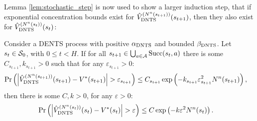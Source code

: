    Lemma \ref{lem:stochastic_step} is now used to show a larger induction step, that if exponential concentration bounds exist for ${\hat{V}^{(N^n(s_{t+1}))}_{{\textnormal{DNTS}}}}(s_{t+1})$, then they also exist for ${\hat{V}^{(N^n(s_{t}))}_{{\textnormal{DNTS}}}}(s_{t})$:
    \begin{lemma} \label{lem:dents_val_induction_step}
        Consider a DENTS process with positive ${\alpha_{{\textnormal{DNTS}}}}$ and bounded ${\beta_{{\textnormal{DNTS}}}}$. Let $s_t\in\mathcal{S}_0$, with $0\leq t < H$. If for all $s_{t+1}\in\bigcup_{a\in\mathcal{A}}{\textnormal{Succ}(s_t,a)}$ there is some $C_{s_{t+1}},k_{s_{t+1}}>0$ such that for any $\varepsilon_{s_{t+1}}>0$:
        \begin{align}
            \Pr\left(\left| {\hat{V}^{(N^n(s_{t+1}))}_{{\textnormal{DNTS}}}}(s_{t+1}) - V^*(s_{t+1}) \right| > \varepsilon_{s_{t+1}} \right) 
                &\leq C_{s_{t+1}}\exp\left( -k_{s_{t+1}}\varepsilon_{s_{t+1}}^2 N^n(s_{t+1}) \right), 
        \end{align}
        then there is some $C,k>0$, for any $\varepsilon>0$:
        \begin{align}
            \Pr\left(\left| {\hat{V}^{(N^n(s_{t}))}_{{\textnormal{DNTS}}}}(s_{t}) - V^*(s_t) \right| > \varepsilon \right) 
                &\leq C\exp\left( -k\varepsilon^2 N^n(s_{t}) \right).
        \end{align}
    \end{lemma}
